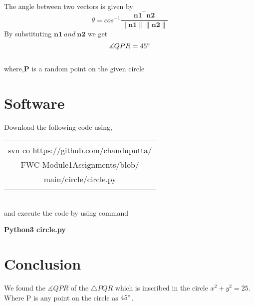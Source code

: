 \documentclass[journal,12pt,twocolumn]{article}
\let\vec\mathbf
\begin{document}
The angle between two vectors is given by
\begin{equation}
\theta = {cos}^{-1}\frac{\vec{n1^{\top}} \vec{n2}}{\vec{\|n1\| \|n2\|}}
   \label{eq-9}
\end{equation}
By substituting $\vec{n1} \:and\: \vec{n2} $ we get
\begin{equation}
 \measuredangle{QPR} = 45\degree
  \label{eq-10}
\end{equation}
\\

where,$ \vec{P} $ is a random point on the given circle
\\


 
\section{Software}
Download the following code using,
\begin{table}[h]
    \centering
    \begin{tabular}{|c|}
    \hline \\
         svn co https://github.com/chanduputta/\\FWC-Module1Assignments/blob/\\main/circle/circle.py  \\
         \\
\hline
    \end{tabular}
\end{table}
\\
and execute the code by using command
\begin{center}
\textbf{Python3  circle.py}
\\
\end{center}

\section{Conclusion}
\begin{center}
We found the  $ \measuredangle{QPR} $ of the $\triangle{PQR}$ which is inscribed in the circle $x^2 + y^2 = 25$. Where P is any point on the circle as $45\degree$.
\end{center}
\end{document}
